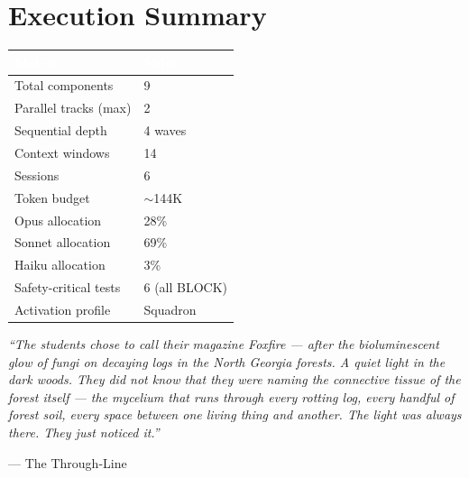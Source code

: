 \documentclass[11pt,letterpaper]{article}
\newcommand{\tableheader}[1]{\textbf{\sffamily\textcolor{white}{#1}}}
\begin{document}
\section{Execution Summary}

\begin{center}
\begin{tabularx}{\textwidth}{L{4.5cm}X}
\toprule
{}
\tableheader{Metric} & \tableheader{Value} \\
\midrule
Total components & 9 \\
Parallel tracks (max) & 2 \\
Sequential depth & 4 waves \\
Context windows & 14 \\
Sessions & 6 \\
Token budget & $\sim$144K \\
Opus allocation & 28\% \\
Sonnet allocation & 69\% \\
Haiku allocation & 3\% \\
Safety-critical tests & 6 (all BLOCK) \\
Activation profile & Squadron \\
\bottomrule
\end{tabularx}
\end{center}

\vspace{1em}
\begin{quotebox}
\textit{``The students chose to call their magazine Foxfire --- after the bioluminescent glow of fungi on decaying logs in the North Georgia forests. A quiet light in the dark woods. They did not know that they were naming the connective tissue of the forest itself --- the mycelium that runs through every rotting log, every handful of forest soil, every space between one living thing and another. The light was always there. They just noticed it.''}

\vspace{0.5em}
\hfill --- The Through-Line
\end{quotebox}
\end{document}
